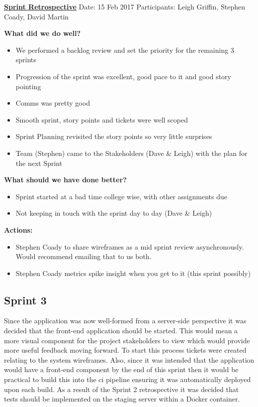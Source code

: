 \underline{\textbf{Sprint Retrospective}}\newline
Date: 15 Feb 2017\newline
Participants: Leigh Griffin, Stephen Coady, David Martin

\textbf{What did we do well?}
\begin{itemize}
	\item We performed a backlog review and set the priority for the remaining 3 sprints
	\item Progression of the sprint was excellent, good pace to it and good story pointing
	\item Comms was pretty good
	\item Smooth sprint, story points and tickets were well scoped
	\item Sprint Planning revisited the story points so very little surprises
	\item Team (Stephen) came to the Stakeholders (Dave \& Leigh) with the plan for the next Sprint
\end{itemize}
\textbf{What should we have done better?}
\begin{itemize}
	\item Sprint started at a bad time college wise, with other assignments due
	\item Not keeping in touch with the sprint day to day (Dave \& Leigh)
\end{itemize}
\textbf{Actions:}
\begin{itemize}
	\item Stephen Coady to share wireframes as a mid sprint review asynchronously. Would recommend emailing that to us both.
	\item Stephen Coady metrics spike insight when you get to it (this sprint possibly)
\end{itemize}

\subsection{Sprint 3}
Since the application was now well-formed from a server-side perspective it was decided that the front-end application should be started. This would mean a more visual component for the project stakeholders to view which would provide more useful feedback moving forward. To start this process tickets were created relating to the system wireframes. Also, since it was intended that the application would have a front-end component by the end of this sprint then it would be practical to build this into the \gls{ci} pipeline ensuring it was automatically deployed upon each build. As a result of the Sprint 2 retrospective it was decided that tests should be implemented on the staging server within a \gls{Docker container}.

